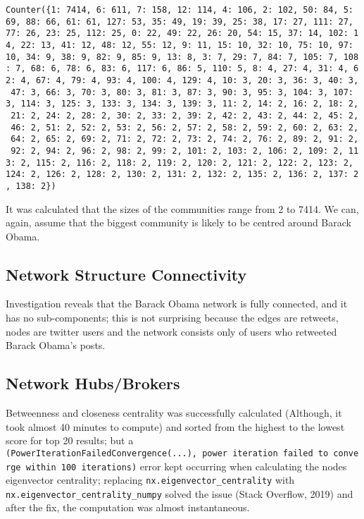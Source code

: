\documentclass[
]{article}
\begin{document}
\texttt{Counter(\{1:\ 7414,\ 6:\ 611,\ 7:\ 158,\ 12:\ 114,\ 4:\ 106,\ 2:\ 102,\ 50:\ 84,\ 5:\ 69,\ 88:\ 66,\ 61:\ 61,\ 127:\ 53,\ 35:\ 49,\ 19:\ 39,\ 25:\ 38,\ 17:\ 27,\ 111:\ 27,\ 77:\ 26,\ 23:\ 25,\ 112:\ 25,\ 0:\ 22,\ 49:\ 22,\ 26:\ 20,\ 54:\ 15,\ 37:\ 14,\ 102:\ 14,\ 22:\ 13,\ 41:\ 12,\ 48:\ 12,\ 55:\ 12,\ 9:\ 11,\ 15:\ 10,\ 32:\ 10,\ 75:\ 10,\ 97:\ 10,\ 34:\ 9,\ 38:\ 9,\ 82:\ 9,\ 85:\ 9,\ 13:\ 8,\ 3:\ 7,\ 29:\ 7,\ 84:\ 7,\ 105:\ 7,\ 108:\ 7,\ 68:\ 6,\ 78:\ 6,\ 83:\ 6,\ 117:\ 6,\ 86:\ 5,\ 110:\ 5,\ 8:\ 4,\ 27:\ 4,\ 31:\ 4,\ 62:\ 4,\ 67:\ 4,\ 79:\ 4,\ 93:\ 4,\ 100:\ 4,\ 129:\ 4,\ 10:\ 3,\ 20:\ 3,\ 36:\ 3,\ 40:\ 3,\ 47:\ 3,\ 66:\ 3,\ 70:\ 3,\ 80:\ 3,\ 81:\ 3,\ 87:\ 3,\ 90:\ 3,\ 95:\ 3,\ 104:\ 3,\ 107:\ 3,\ 114:\ 3,\ 125:\ 3,\ 133:\ 3,\ 134:\ 3,\ 139:\ 3,\ 11:\ 2,\ 14:\ 2,\ 16:\ 2,\ 18:\ 2,\ 21:\ 2,\ 24:\ 2,\ 28:\ 2,\ 30:\ 2,\ 33:\ 2,\ 39:\ 2,\ 42:\ 2,\ 43:\ 2,\ 44:\ 2,\ 45:\ 2,\ 46:\ 2,\ 51:\ 2,\ 52:\ 2,\ 53:\ 2,\ 56:\ 2,\ 57:\ 2,\ 58:\ 2,\ 59:\ 2,\ 60:\ 2,\ 63:\ 2,\ 64:\ 2,\ 65:\ 2,\ 69:\ 2,\ 71:\ 2,\ 72:\ 2,\ 73:\ 2,\ 74:\ 2,\ 76:\ 2,\ 89:\ 2,\ 91:\ 2,\ 92:\ 2,\ 94:\ 2,\ 96:\ 2,\ 98:\ 2,\ 99:\ 2,\ 101:\ 2,\ 103:\ 2,\ 106:\ 2,\ 109:\ 2,\ 113:\ 2,\ 115:\ 2,\ 116:\ 2,\ 118:\ 2,\ 119:\ 2,\ 120:\ 2,\ 121:\ 2,\ 122:\ 2,\ 123:\ 2,\ 124:\ 2,\ 126:\ 2,\ 128:\ 2,\ 130:\ 2,\ 131:\ 2,\ 132:\ 2,\ 135:\ 2,\ 136:\ 2,\ 137:\ 2,\ 138:\ 2\})}

It was calculated that the sizes of the communities range from 2 to
7414. We can, again, assume that the biggest community is likely to be
centred around Barack Obama.

\hypertarget{network-structure-connectivity}{%
\subsection{Network Structure
Connectivity}\label{network-structure-connectivity}}

Investigation reveals that the Barack Obama network is fully connected,
and it has no sub-components; this is not surprising because the edges
are retweets, nodes are twitter users and the network consists only of
users who retweeted Barack Obama's posts.

\hypertarget{network-hubsbrokers}{%
\subsection{Network Hubs/Brokers}\label{network-hubsbrokers}}

Betweenness and closeness centrality was successfully calculated
(Although, it took almost 40 minutes to compute) and sorted from the
highest to the lowest score for top 20 results; but a
\texttt{(PowerIterationFailedConvergence(...),\ \textquotesingle{}power\ iteration\ failed\ to\ converge\ within\ 100\ iterations\textquotesingle{})}
error kept occurring when calculating the nodes eigenvector centrality;
replacing \texttt{nx.eigenvector\_centrality} with
\texttt{nx.eigenvector\_centrality\_numpy} solved the issue (Stack
Overflow, 2019) and after the fix, the computation was almost
instantaneous.
\end{document}
